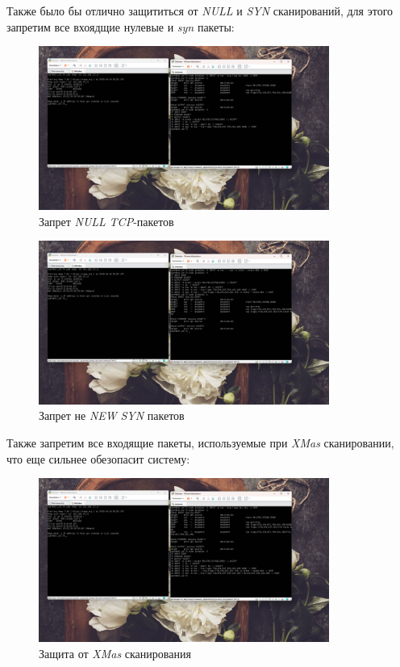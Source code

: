 \documentclass[a4paper]{article}
\begin{document}
  Также было бы отлично защититься от \textit{NULL} и \textit{SYN} сканирований,
  для этого запретим все вхоядщие нулевые и \textit{syn} пакеты:

  \begin{figure}[H]
    \centering
    \includegraphics[width=0.85\textwidth]{03_00 (47)}
    \caption{Запрет \textit{NULL} \textit{TCP}-пакетов}
    \label{img:47}
  \end{figure}

  \begin{figure}[H]
    \centering
    \includegraphics[width=0.85\textwidth]{03_00 (48)}
    \caption{Запрет не \textit{NEW} \textit{SYN} пакетов}
    \label{img:48}
  \end{figure}

  Также запретим все входящие пакеты, используемые при \textit{XMas} сканировании,
  что еще сильнее обезопасит систему:

  \begin{figure}[H]
    \centering
    \includegraphics[width=0.85\textwidth]{03_00 (49)}
    \caption{Защита от \textit{XMas} сканирования}
    \label{img:49}
  \end{figure}
\end{document}
